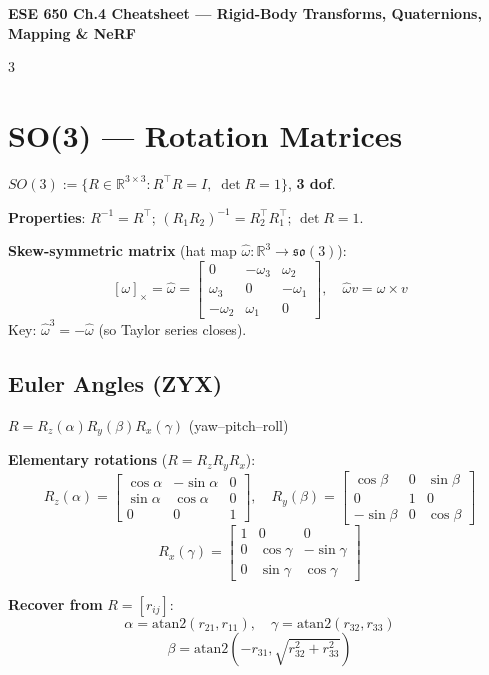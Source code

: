 \documentclass[9pt,landscape]{article}
\begin{document}
\begin{center}
  {\normalsize\bfseries ESE 650 Ch.4 Cheatsheet --- Rigid-Body Transforms, Quaternions, Mapping \& NeRF}
\end{center}
\vspace{-4pt}
\begin{multicols}{3}

\section{SO(3) — Rotation Matrices}

$SO(3):=\{R\in\mathbb{R}^{3\times3}: R^\top R=I,\;\det R=1\}$, \textbf{3 dof}.

\textbf{Properties}: $R^{-1}=R^\top$; $(R_1R_2)^{-1}=R_2^\top R_1^\top$; $\det R=1$.

\textbf{Skew-symmetric matrix} (hat map $\hat\omega:\mathbb{R}^3\to\mathfrak{so}(3)$):
\[[\omega]_\times = \hat\omega =\begin{bmatrix}0&-\omega_3&\omega_2\\\omega_3&0&-\omega_1\\-\omega_2&\omega_1&0\end{bmatrix},\quad \hat\omega v = \omega\times v\]
Key: $\hat\omega^3 = -\hat\omega$ (so Taylor series closes).

\subsection{Euler Angles (ZYX)}
$R=R_z(\alpha)R_y(\beta)R_x(\gamma)$ \quad (yaw–pitch–roll)

\textbf{Elementary rotations} ($R=R_z R_y R_x$):
\[R_z(\alpha)=\begin{bmatrix}\cos\alpha&-\sin\alpha&0\\\sin\alpha&\cos\alpha&0\\0&0&1\end{bmatrix},\quad
R_y(\beta)=\begin{bmatrix}\cos\beta&0&\sin\beta\\0&1&0\\-\sin\beta&0&\cos\beta\end{bmatrix}\]
\[R_x(\gamma)=\begin{bmatrix}1&0&0\\0&\cos\gamma&-\sin\gamma\\0&\sin\gamma&\cos\gamma\end{bmatrix}\]

\textbf{Recover from} $R=[r_{ij}]$:
\[\alpha=\mathrm{atan2}(r_{21},r_{11}),\quad\gamma=\mathrm{atan2}(r_{32},r_{33})\]
\[\beta=\mathrm{atan2}(-r_{31},\sqrt{r_{32}^2+r_{33}^2})\]


\end{multicols}
\end{document}
